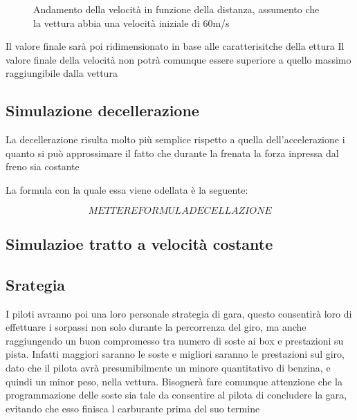 \documentclass[a4paper,11pt, twoside]{book}
\begin{document}
	\begin{figure}[h]
	  \centering
	  \caption{Andamento della velocità in funzione della distanza, assumento che la vettura abbia una
		    velocità iniziale di 60m/s}
	  \label{fgr:GraficoVelocitaTraslato}

	\end{figure}
	
	Il valore finale sarà poi ridimensionato in base alle caratterisitche della ettura
	Il valore finale della velocità non potrà comunque essere superiore a quello massimo raggiungibile dalla vettura

      \subsection{Simulazione decellerazione}
	La decellerazione risulta molto più semplice rispetto a quella dell'accelerazione i quanto
	si può approssimare il fatto che durante la frenata la forza inpressa dal freno sia costante
	
	La formula con la quale essa viene odellata è la seguente:
	
	$$METTERE FORMULA DECELLAZIONE$$
	
      \subsection{Simulazioe tratto a velocità costante}
      
      \subsection{Srategia}
      
	I piloti avranno poi una loro personale strategia di gara, questo consentirà loro di effettuare
	i sorpassi non solo durante la percorrenza del giro, ma anche raggiungendo un buon compromesso
	tra numero di soste ai box e prestazioni su pista. Infatti maggiori saranno le soste e migliori saranno le prestazioni
	sul giro, dato che il pilota avrà presumibilmente un minore quantitativo di benzina, e quindi un minor peso, nella vettura.
	Bisognerà fare comunque attenzione che la programmazione delle soste sia tale da consentire al pilota di concludere la gara,
	evitando che esso finisca l carburante prima del suo termine
      
\end{document}
